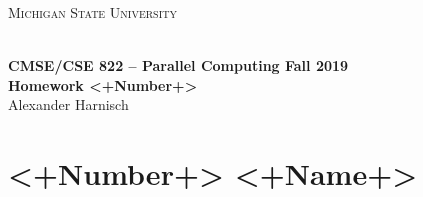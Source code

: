 \documentclass[a4paper, 11pt]{article}
\begin{document}
\noindent
\centerline{\small{\textsc{Michigan State University}}} \\
\large{\textbf{CMSE/CSE 822 – Parallel Computing \hfill Fall 2019 \\
Homework <+Number+>}} \\
Alexander Harnisch \\
\noindent\makebox[\linewidth]{\rule{\textwidth}{0.4pt}}

\section*{<+Number+> <+Name+>}
\end{document}
